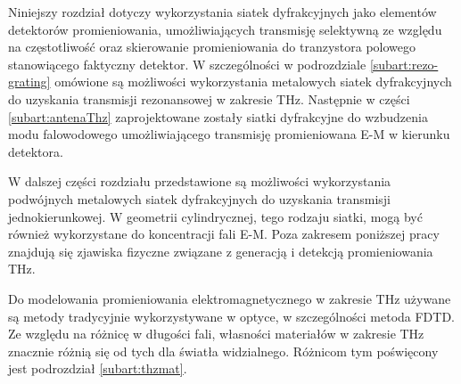 Niniejszy rozdział dotyczy wykorzystania siatek dyfrakcyjnych jako elementów detektorów promieniowania, umożliwiających transmisję selektywną ze względu na częstotliwość oraz skierowanie promieniowania do tranzystora polowego stanowiącego faktyczny detektor. W szczególności w podrozdziale \ref{subart:rezo-grating} omówione są możliwości wykorzystania metalowych siatek dyfrakcyjnych do uzyskania transmisji rezonansowej w zakresie THz. Następnie w części \ref{subart:antenaThz} zaprojektowane zostały siatki dyfrakcyjne do wzbudzenia modu falowodowego umożliwiającego transmisję promieniowana E-M w kierunku detektora.

W dalszej części rozdziału przedstawione są możliwości wykorzystania podwójnych metalowych siatek dyfrakcyjnych do uzyskania transmisji jednokierunkowej. W geometrii cylindrycznej, tego rodzaju siatki, mogą być również wykorzystane do koncentracji fali E-M. Poza zakresem poniższej pracy znajdują się zjawiska fizyczne związane z generacją i detekcją promieniowania THz.

Do modelowania promieniowania elektromagnetycznego w zakresie THz używane są metody tradycyjnie wykorzystywane w optyce, w  szczególności metoda FDTD. Ze względu na różnicę w długości fali, własności materiałów w zakresie THz znacznie różnią się od tych dla światła widzialnego. Różnicom tym poświęcony jest podrozdział \ref{subart:thzmat}.
